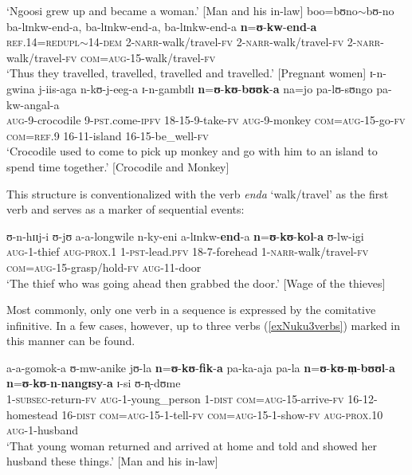 \begin{exe}
\glt `Ngoosi grew up and became a woman.' [Man and his in-law]
\ex\label{exNukuRepetition} \gll boo=bʊno$\sim$bʊ-no ba-lɪnkw-end-a, ba-lɪnkw-end-a, ba-lɪnkw-end-a \textbf{n}=\textbf{ʊ}-\textbf{kw}-\textbf{end}-\textbf{a}\\
\textsc{ref.14}=\textsc{redupl}$\sim$14-\textsc{dem} 2-\textsc{narr}-walk/travel-\textsc{fv} 2-\textsc{narr}-walk/travel-\textsc{fv} 2-\textsc{narr}-walk/travel-\textsc{fv} \textsc{com}=\textsc{aug}-15-walk/travel-\textsc{fv}\\
\glt \lq Thus they travelled, travelled, travelled and travelled.' [Pregnant women]
\ex\label{exNukuINF} \gll ɪ-n-gwina j-iis-aga n-kʊ-j-eeg-a ɪ-n-gambɪlɪ \textbf{n}=\textbf{ʊ}-\textbf{kʊ}-\textbf{bʊʊk}-\textbf{a} na=jo pa-lʊ-sʊngo pa-kw-angal-a\\
\textsc{aug}-9-crocodile 9-\textsc{pst}.come-\textsc{ipfv} 18-15-9-take-\textsc{fv} \textsc{aug}-9-monkey \textsc{com}=\textsc{aug}-15-go-\textsc{fv} \textsc{com}=\textsc{ref.9} 16-11-island 16-15-be\_well-\textsc{fv}\\
\glt \lq Crocodile used to come to pick up monkey and go with him to an island to spend time together.' [Crocodile and Monkey] %
\end{exe}

This structure is conventionalized with the verb \textit{enda} \lq walk/travel' as the first verb and serves as a marker of sequential events:

\begin{exe}
\ex \gll ʊ-n-hɪɪj-i ʊ-jʊ a-a-longwile n-ky-eni a-lɪnkw-\textbf{end}-a \textbf{n}=\textbf{ʊ}-\textbf{kʊ}-\textbf{kol}-\textbf{a} ʊ-lw-igi\\
\textsc{aug}-1-thief \textsc{aug}-\textsc{prox.1} 1-\textsc{pst}-lead.\textsc{pfv} 18-7-forehead 1-\textsc{narr}-walk/travel-\textsc{fv} \textsc{com}=\textsc{aug}-15-grasp/hold-\textsc{fv} \textsc{aug}-11-door\\
\glt \lq The thief who was going ahead then grabbed the door.' [Wage of the thieves]
\end{exe}

Most commonly, only one verb in a sequence is expressed by the comitative infinitive. In a few cases, however, up to three verbs (\ref{exNuku3verbs}) marked in this manner can be found.
\begin{exe}
\ex \label{exNuku3verbs}\gll a-a-gomok-a ʊ-mw-anike jʊ-la \textbf{n}=\textbf{ʊ}-\textbf{kʊ}-\textbf{fik}-\textbf{a} pa-ka-aja pa-la \textbf{n}=\textbf{ʊ}-\textbf{kʊ}-\textbf{m̩}-\textbf{bʊʊl}-\textbf{a} \textbf{n}=\textbf{ʊ}-\textbf{kʊ}-\textbf{n}-\textbf{nangɪsy}-\textbf{a} ɪ-si ʊ-n̩-dʊme\\
1-\textsc{subsec}-return-\textsc{fv} \textsc{aug}-1-young\_person 1-\textsc{dist} \textsc{com}=\textsc{aug}-15-arrive-\textsc{fv} 16-12-homestead 16-\textsc{dist} \textsc{com}=\textsc{aug}-15-1-tell-\textsc{fv} \textsc{com}=\textsc{aug}-15-1-show-\textsc{fv} \textsc{aug}-\textsc{prox.10} \textsc{aug}-1-husband\\
\glt `That young woman returned and arrived at home and told and showed her husband these things.' [Man and his in-law]
\end{exe}


